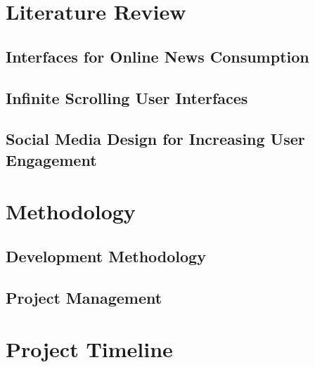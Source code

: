 \documentclass[12pt,titlepage]{article}
\begin{document}
\section{Literature Review}

  \subsection{Interfaces for Online News Consumption}

  \subsection{Infinite Scrolling User Interfaces}

  \subsection{Social Media Design for Increasing User Engagement}

\section{Methodology}

  \subsection{Development Methodology}

  \subsection{Project Management}

\section{Project Timeline}


{}

\end{document}
